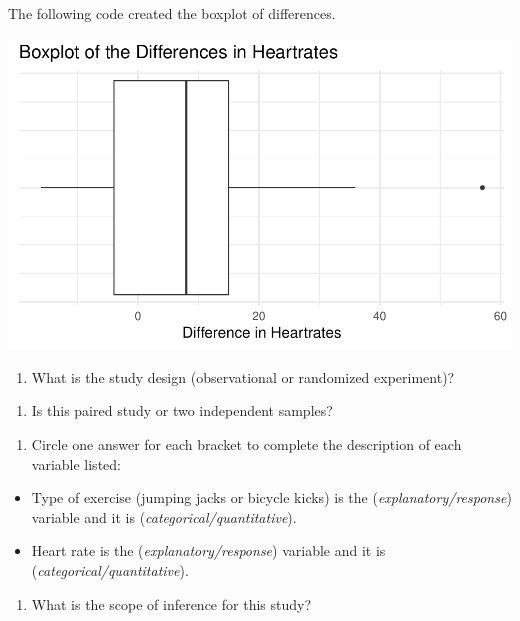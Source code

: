 \documentclass[
]{report}
\providecommand{\tightlist}{%
  \setlength{\itemsep}{0pt}\setlength{\parskip}{0pt}}
\begin{document}
The following code created the boxplot of differences.

\begin{center}\includegraphics[width=0.6\linewidth]{14-UR-module11_review_files/figure-latex/unnamed-chunk-2-1} \end{center}

\begin{enumerate}
\def\labelenumi{\arabic{enumi}.}
\tightlist
\item
  What is the study design (observational or randomized experiment)?
\end{enumerate}

\vspace{0.5in}

\begin{enumerate}
\def\labelenumi{\arabic{enumi}.}
\setcounter{enumi}{1}
\tightlist
\item
  Is this paired study or two independent samples?
\end{enumerate}

\vspace{0.2in}

\begin{enumerate}
\def\labelenumi{\arabic{enumi}.}
\setcounter{enumi}{2}
\tightlist
\item
  Circle one answer for each bracket to complete the description of each variable listed:
\end{enumerate}

\begin{itemize}
\item
  Type of exercise (jumping jacks or bicycle kicks) is the (\emph{explanatory/response}) variable and it is (\emph{categorical/quantitative}).
\item
  Heart rate is the (\emph{explanatory/response}) variable and it is (\emph{categorical/quantitative}).
\end{itemize}

\begin{enumerate}
\def\labelenumi{\arabic{enumi}.}
\setcounter{enumi}{3}
\tightlist
\item
  What is the scope of inference for this study?
\end{enumerate}
\end{document}
